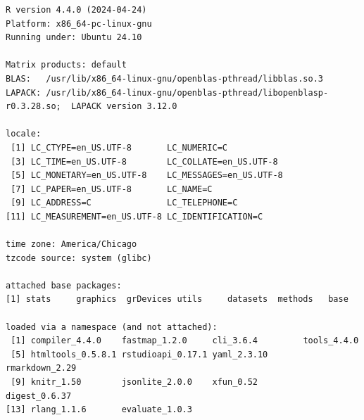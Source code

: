 \documentclass[
  12,
  letterpaper,
  DIV=11,
  numbers=noendperiod]{scrartcl}
\begin{document}
\begin{verbatim}
R version 4.4.0 (2024-04-24)
Platform: x86_64-pc-linux-gnu
Running under: Ubuntu 24.10

Matrix products: default
BLAS:   /usr/lib/x86_64-linux-gnu/openblas-pthread/libblas.so.3 
LAPACK: /usr/lib/x86_64-linux-gnu/openblas-pthread/libopenblasp-r0.3.28.so;  LAPACK version 3.12.0

locale:
 [1] LC_CTYPE=en_US.UTF-8       LC_NUMERIC=C              
 [3] LC_TIME=en_US.UTF-8        LC_COLLATE=en_US.UTF-8    
 [5] LC_MONETARY=en_US.UTF-8    LC_MESSAGES=en_US.UTF-8   
 [7] LC_PAPER=en_US.UTF-8       LC_NAME=C                 
 [9] LC_ADDRESS=C               LC_TELEPHONE=C            
[11] LC_MEASUREMENT=en_US.UTF-8 LC_IDENTIFICATION=C       

time zone: America/Chicago
tzcode source: system (glibc)

attached base packages:
[1] stats     graphics  grDevices utils     datasets  methods   base     

loaded via a namespace (and not attached):
 [1] compiler_4.4.0    fastmap_1.2.0     cli_3.6.4         tools_4.4.0      
 [5] htmltools_0.5.8.1 rstudioapi_0.17.1 yaml_2.3.10       rmarkdown_2.29   
 [9] knitr_1.50        jsonlite_2.0.0    xfun_0.52         digest_0.6.37    
[13] rlang_1.1.6       evaluate_1.0.3   
\end{verbatim}
\end{document}
